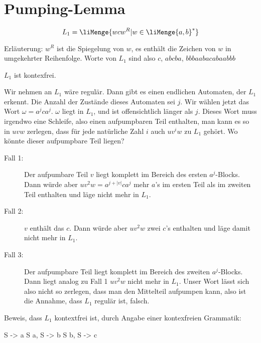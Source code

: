 \documentclass{lehramt-informatik-aufgabe}
\begin{document}
\section{Pumping-Lemma
}


\begin{liExkurs}
\liPumpingRegulaer
\end{liExkurs}

\begin{displaymath}
L_1 = \liMenge{ w c w^R | w \in \liMenge{a, b}^* }
\end{displaymath}

\noindent
Erläuterung: $w^R$ ist die Spiegelung von $w$, \dh es enthält die
Zeichen von $w$ in umgekehrter Reihenfolge. Worte von $L_1$ sind also
\zB $c$, $abcba$, $bbbaabacabaabbb$

\begin{liAntwort}
$L_1$ ist kontexfrei.


\noindent
Wir nehmen an $L_1$ wäre regulär. Dann gibt es einen endlichen
Automaten, der $L_1$ erkennt. Die Anzahl der Zustände dieses Automaten
sei $j$. Wir wählen jetzt das Wort $\omega = a^j c a^j$. $\omega$ liegt
in $L_1$, und ist offensichtlich länger als $j$. Dieses Wort muss
irgendwo eine Schleife, also einen aufpumpbaren Teil enthalten, \dh
man kann es so in $uvw$ zerlegen, dass für jede natürliche Zahl $i$ auch
$uv^iw$ zu $L_1$ gehört. Wo könnte dieser aufpumpbare Teil liegen?

\begin{description}
\item[Fall 1:]

Der aufpumbare Teil $v$ liegt komplett im Bereich des ersten
$a^j$-Blocks. Dann würde aber $uv^2w = a^{j + |v|} c a^j$ mehr $a$’s im
ersten Teil als im zweiten Teil enthalten und läge nicht mehr in $L_1$.

\item[Fall 2:]

$v$ enthält das $c$. Dann würde aber $u v^2 w$ zwei $c$’s enthalten und
läge damit nicht mehr in $L_1$.

\item[Fall 3:]

Der aufpumpbare Teil liegt komplett im Bereich des zweiten $a^j$-Blocks.
Dann liegt analog zu Fall 1 $u v^2 w$ nicht mehr in $L_1$. Unser Wort
lässt sich also nicht so zerlegen, dass man den Mittelteil aufpumpen
kann, also ist die Annahme, dass $L_1$ regulär ist, falsch.
\end{description}
\noindent
Beweis, dass $L_1$ kontextfrei ist, durch Angabe einer kontexfreien
Grammatik:

\noindent
\begin{liProduktionsRegeln}
S -> a S a,
S -> b S b,
S -> c
\end{liProduktionsRegeln}
\end{liAntwort}
\end{document}
